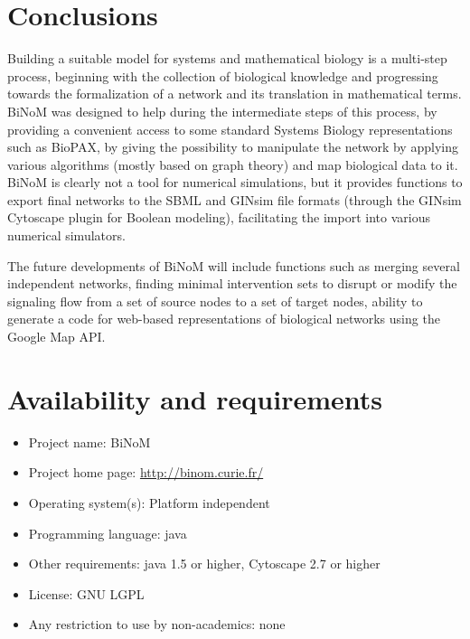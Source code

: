 \documentclass[10pt]{bmc_article}
\newenvironment{bmcformat}{\baselineskip20pt\sloppy\setboolean{publ}{false}}{\baselineskip20pt\sloppy}
\begin{document}
\begin{bmcformat}
\section*{Conclusions}

Building a suitable model for systems and mathematical biology is a multi-step
process, beginning with the collection of biological knowledge and progressing
towards the formalization of a network and its translation in mathematical
terms. BiNoM was designed to help during the intermediate steps of this process,
by providing a convenient access to some standard Systems Biology
representations such as BioPAX, by giving the possibility to manipulate the
network by applying various algorithms (mostly based on graph theory)
and map biological data to it. BiNoM is clearly not a tool for numerical
simulations, but it provides functions to export final networks to the SBML and
GINsim file formats (through the GINsim Cytoscape plugin for Boolean modeling), facilitating the
import into various numerical simulators.

The future developments of BiNoM will include functions such as merging several
independent networks, finding minimal intervention sets to disrupt or modify the
signaling flow from a set of source nodes to a set of target nodes, ability to
generate a code for web-based representations of biological networks using the
Google Map API.


\section*{Availability and requirements}

\begin{itemize}
\item Project name: BiNoM
\item Project home page: \url{http://binom.curie.fr/}
\item Operating system(s): Platform independent
\item Programming language: java
\item Other requirements: java 1.5 or higher, Cytoscape 2.7 or higher
\item License: GNU LGPL
\item Any restriction to use by non-academics: none
\end{itemize}






\end{bmcformat}
\end{document}
